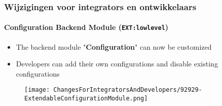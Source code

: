 %

\begin{frame}[fragile]
	\frametitle{Wijzigingen voor integrators en ontwikkelaars}
	\framesubtitle{Configuration Backend Module (\texttt{EXT:lowlevel})}

	\lstset{basicstyle=\tiny\ttfamily}

	\begin{itemize}
		\item The backend module "\textbf{Configuration}" can now be customized
		\item Developers can add their own configurations and disable existing configurations
	\end{itemize}

	\begin{figure}
		\texttt{[image: ChangesForIntegratorsAndDevelopers/92929-ExtendableConfigurationModule.png]}
	\end{figure}

\end{frame}

